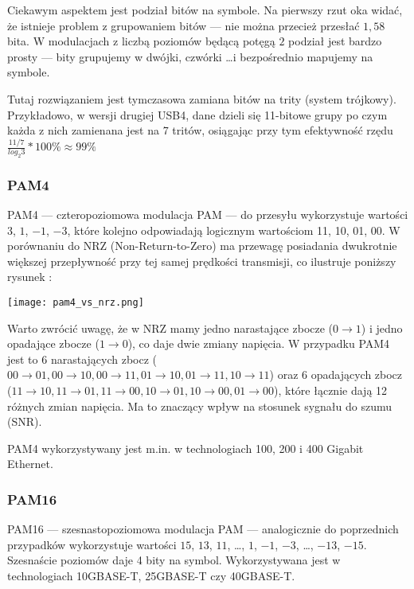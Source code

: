 Ciekawym aspektem jest podział bitów na symbole. Na pierwszy rzut oka widać, że istnieje problem z grupowaniem bitów --- nie można przecież przesłać $1,58$ bita. W modulacjach z liczbą poziomów będącą potęgą $2$ podział jest bardzo prosty --- bity grupujemy w dwójki, czwórki \dots i bezpośrednio mapujemy na symbole.

Tutaj rozwiązaniem jest tymczasowa zamiana bitów na trity (system trójkowy). Przykładowo, w wersji drugiej USB4, dane dzieli się 11-bitowe grupy po czym każda z nich zamienana jest na 7 tritów, osiągając przy tym
efektywność rzędu $\frac{11/7}{log_{2}{3}} * 100\% \approx 99\% $


\subsubsection{PAM4}

PAM4 --- czteropoziomowa modulacja PAM --- do przesyłu wykorzystuje wartości $3$, $1$, $-1$, $-3$, które kolejno odpowiadają logicznym wartościom 11, 10, 01, 00. W porównaniu do NRZ (Non-Return-to-Zero) ma przewagę posiadania dwukrotnie większej przepływność przy tej samej prędkości transmisji, co ilustruje poniższy rysunek \cite{Intel-pam4}:

\texttt{[image: pam4\_vs\_nrz.png]}

Warto zwrócić uwagę, że w NRZ mamy jedno narastające zbocze ($0 \rightarrow 1$) i jedno opadające zbocze ($1 \rightarrow 0$), co daje dwie zmiany napięcia. W przypadku PAM4 jest to 6 narastających zbocz
($00 \rightarrow 01, 00 \rightarrow 10, 00 \rightarrow 11, 01 \rightarrow 10, 01 \rightarrow 11, 10 \rightarrow 11$) oraz 6 opadających zbocz
($11 \rightarrow 10, 11 \rightarrow 01, 11 \rightarrow 00, 10 \rightarrow 01, 10 \rightarrow 00, 01 \rightarrow 00$), które łącznie dają 12 różnych zmian napięcia.
Ma to znaczący wpływ na stosunek sygnału do szumu (SNR).

PAM4 wykorzystywany jest m.in. w technologiach 100, 200 i 400 Gigabit Ethernet.

\subsubsection{PAM16}

PAM16 --- szesnastopoziomowa modulacja PAM --- analogicznie do poprzednich przypadków wykorzystuje wartości $15$, $13$, $11$, \dots , $1$, $-1$, $-3$, \dots , $-13$, $-15$. Szesnaście poziomów daje 4 bity na symbol. Wykorzystywana jest w technologiach 10GBASE-T, 25GBASE-T czy 40GBASE-T.